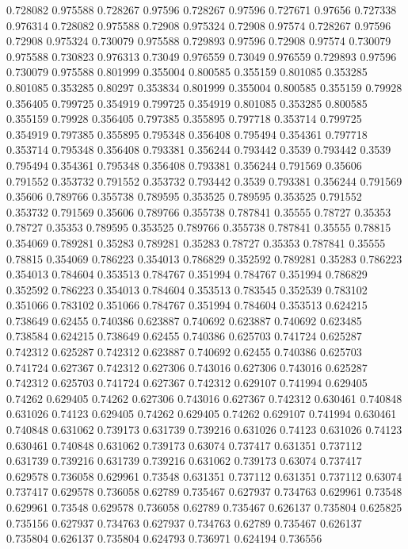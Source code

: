 0.728082 0.975588
0.728267 0.97596
0.728267 0.97596
0.727671 0.97656
0.727338 0.976314
0.728082 0.975588
0.72908 0.975324
0.72908 0.97574
0.728267 0.97596
0.72908 0.975324
0.730079 0.975588
0.729893 0.97596
0.72908 0.97574
0.730079 0.975588
0.730823 0.976313
0.73049 0.976559
0.73049 0.976559
0.729893 0.97596
0.730079 0.975588
0.801999 0.355004
0.800585 0.355159
0.801085 0.353285
0.801085 0.353285
0.80297 0.353834
0.801999 0.355004
0.800585 0.355159
0.79928 0.356405
0.799725 0.354919
0.799725 0.354919
0.801085 0.353285
0.800585 0.355159
0.79928 0.356405
0.797385 0.355895
0.797718 0.353714
0.799725 0.354919
0.797385 0.355895
0.795348 0.356408
0.795494 0.354361
0.797718 0.353714
0.795348 0.356408
0.793381 0.356244
0.793442 0.3539
0.793442 0.3539
0.795494 0.354361
0.795348 0.356408
0.793381 0.356244
0.791569 0.35606
0.791552 0.353732
0.791552 0.353732
0.793442 0.3539
0.793381 0.356244
0.791569 0.35606
0.789766 0.355738
0.789595 0.353525
0.789595 0.353525
0.791552 0.353732
0.791569 0.35606
0.789766 0.355738
0.787841 0.35555
0.78727 0.35353
0.78727 0.35353
0.789595 0.353525
0.789766 0.355738
0.787841 0.35555
0.78815 0.354069
0.789281 0.35283
0.789281 0.35283
0.78727 0.35353
0.787841 0.35555
0.78815 0.354069
0.786223 0.354013
0.786829 0.352592
0.789281 0.35283
0.786223 0.354013
0.784604 0.353513
0.784767 0.351994
0.784767 0.351994
0.786829 0.352592
0.786223 0.354013
0.784604 0.353513
0.783545 0.352539
0.783102 0.351066
0.783102 0.351066
0.784767 0.351994
0.784604 0.353513
0.624215 0.738649
0.62455 0.740386
0.623887 0.740692
0.623887 0.740692
0.623485 0.738584
0.624215 0.738649
0.62455 0.740386
0.625703 0.741724
0.625287 0.742312
0.625287 0.742312
0.623887 0.740692
0.62455 0.740386
0.625703 0.741724
0.627367 0.742312
0.627306 0.743016
0.627306 0.743016
0.625287 0.742312
0.625703 0.741724
0.627367 0.742312
0.629107 0.741994
0.629405 0.74262
0.629405 0.74262
0.627306 0.743016
0.627367 0.742312
0.630461 0.740848
0.631026 0.74123
0.629405 0.74262
0.629405 0.74262
0.629107 0.741994
0.630461 0.740848
0.631062 0.739173
0.631739 0.739216
0.631026 0.74123
0.631026 0.74123
0.630461 0.740848
0.631062 0.739173
0.63074 0.737417
0.631351 0.737112
0.631739 0.739216
0.631739 0.739216
0.631062 0.739173
0.63074 0.737417
0.629578 0.736058
0.629961 0.73548
0.631351 0.737112
0.631351 0.737112
0.63074 0.737417
0.629578 0.736058
0.62789 0.735467
0.627937 0.734763
0.629961 0.73548
0.629961 0.73548
0.629578 0.736058
0.62789 0.735467
0.626137 0.735804
0.625825 0.735156
0.627937 0.734763
0.627937 0.734763
0.62789 0.735467
0.626137 0.735804
0.626137 0.735804
0.624793 0.736971
0.624194 0.736556

